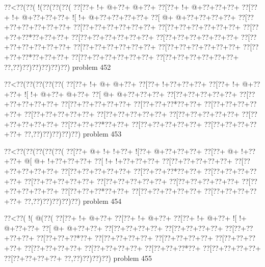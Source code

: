 \vbox{\vbox{\goo
\0??<\0??(\0??(\- !(\0??(\0??(\0??(
\0??[\0??+\- !+\- @+\0??+\- @+\0??+
\0??[\0??+\- !+\- @+\0??+\0??+\0??+
\0??[\0??+\- !+\- @+\0??+\0??+\0??+
\- ![\- !+\- @+\0??+\0??+\0??+\0??+
\0??[\- @+\- @+\0??+\0??+\0??+\0??+
\0??[\0??+\0??+\0??+\0??+\0??+\0??+
\0??[\0??+\0??+\0??+\0??+\0??+\0??+
\0??[\0??+\0??+\0??+\0??+\0??+\0??+
\0??[\0??+\0??+\0??*\0??+\0??+\0??+
\0??[\0??+\0??+\0??+\0??+\0??+\0??+
\0??[\0??+\0??+\0??+\0??+\0??+\0??+
\0??[\0??+\0??+\0??+\0??+\0??+\0??+
\0??[\0??+\0??+\0??+\0??+\0??+\0??+
\0??[\0??+\0??+\0??+\0??+\0??+\0??+
\0??[\0??+\0??+\0??*\0??+\0??+\0??+
\0??[\0??+\0??+\0??+\0??+\0??+\0??+
\0??[\0??+\0??+\0??+\0??+\0??+\0??+
\0??,\0??)\0??)\0??)\0??)\0??)\0??)
}
\hfil problem 452\hfil\break
}

\vbox{\vbox{\goo
\0??<\0??(\0??(\0??(\0??(\0??(
\0??[\0??+\- !+\- @+\- @+\0??+
\0??[\0??+\- !+\0??+\0??+\0??+
\0??[\0??+\- !+\- @+\0??+\0??+
\- ![\- !+\- @+\0??+\- @+\0??+
\0??[\- @+\- @+\0??+\0??+\0??+
\0??[\0??+\0??+\0??+\0??+\0??+
\0??[\0??+\0??+\0??+\0??+\0??+
\0??[\0??+\0??+\0??+\0??+\0??+
\0??[\0??+\0??+\0??*\0??+\0??+
\0??[\0??+\0??+\0??+\0??+\0??+
\0??[\0??+\0??+\0??+\0??+\0??+
\0??[\0??+\0??+\0??+\0??+\0??+
\0??[\0??+\0??+\0??+\0??+\0??+
\0??[\0??+\0??+\0??+\0??+\0??+
\0??[\0??+\0??+\0??*\0??+\0??+
\0??[\0??+\0??+\0??+\0??+\0??+
\0??[\0??+\0??+\0??+\0??+\0??+
\0??,\0??)\0??)\0??)\0??)\0??)
}
\hfil problem 453\hfil\break
}

\vbox{\vbox{\goo
\0??<\0??(\0??(\0??(\0??(\0??(
\0??[\0??+\- @+\- !+\- !+\0??+
\- ![\0??+\- @+\0??+\0??+\0??+
\0??[\0??+\- @+\- !+\0??+\0??+
\- @[\- @+\- !+\0??+\0??+\0??+
\0??[\- !+\- !+\0??+\0??+\0??+
\0??[\0??+\0??+\0??+\0??+\0??+
\0??[\0??+\0??+\0??+\0??+\0??+
\0??[\0??+\0??+\0??+\0??+\0??+
\0??[\0??+\0??+\0??*\0??+\0??+
\0??[\0??+\0??+\0??+\0??+\0??+
\0??[\0??+\0??+\0??+\0??+\0??+
\0??[\0??+\0??+\0??+\0??+\0??+
\0??[\0??+\0??+\0??+\0??+\0??+
\0??[\0??+\0??+\0??+\0??+\0??+
\0??[\0??+\0??+\0??*\0??+\0??+
\0??[\0??+\0??+\0??+\0??+\0??+
\0??[\0??+\0??+\0??+\0??+\0??+
\0??,\0??)\0??)\0??)\0??)\0??)
}
\hfil problem 454\hfil\break
}

\vbox{\vbox{\goo
\0??<\0??(\- !(\- @(\0??(
\0??[\0??+\- !+\- @+\0??+
\0??[\0??+\- !+\- @+\0??+
\0??[\0??+\- !+\- @+\0??+
\- ![\- !+\- @+\0??+\0??+
\0??[\- @+\- @+\0??+\0??+
\0??[\0??+\0??+\0??+\0??+
\0??[\0??+\0??+\0??+\0??+
\0??[\0??+\0??+\0??+\0??+
\0??[\0??+\0??+\0??*\0??+
\0??[\0??+\0??+\0??+\0??+
\0??[\0??+\0??+\0??+\0??+
\0??[\0??+\0??+\0??+\0??+
\0??[\0??+\0??+\0??+\0??+
\0??[\0??+\0??+\0??+\0??+
\0??[\0??+\0??+\0??*\0??+
\0??[\0??+\0??+\0??+\0??+
\0??[\0??+\0??+\0??+\0??+
\0??,\0??)\0??)\0??)\0??)
}
\hfil problem 455\hfil\break
}

